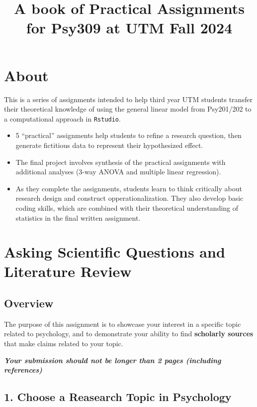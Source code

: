 \documentclass[
]{book}
\title{A book of Practical Assignments for Psy309 at UTM Fall 2024}
\author{}
\date{\vspace{-2.5em}}
\begin{document}
\maketitle

{
\setcounter{tocdepth}{1}
\tableofcontents
}
\chapter*{About}\label{about}

This is a series of assignments intended to help third year UTM students transfer their theoretical knowledge of using the general linear model from Psy201/202 to a computational approach in \texttt{Rstudio}.

\begin{itemize}
\item
  5 ``practical'' assignments help students to refine a research question, then generate fictitious data to represent their hypothesized effect.
\item
  The final project involves synthesis of the practical assignments with additional analyses (3-way ANOVA and multiple linear regression).
\item
  As they complete the assignments, students learn to think critically about research design and construct opperationalization. They also develop basic coding skills, which are combined with their theoretical understanding of statistics in the final written assignment.
\end{itemize}

\chapter{Asking Scientific Questions and Literature Review}\label{asking-scientific-questions-and-literature-review}

\section*{Overview}\label{overview}

The purpose of this assignment is to showcase your interest in a specific topic related to psychology, and to demonstrate your ability to find \textbf{scholarly sources} that make claims related to your topic.

\textbf{\emph{Your submission should not be longer than 2 pages (including references)}}

\section*{1. Choose a Reasearch Topic in Psychology}\label{choose-a-reasearch-topic-in-psychology}
\end{document}
